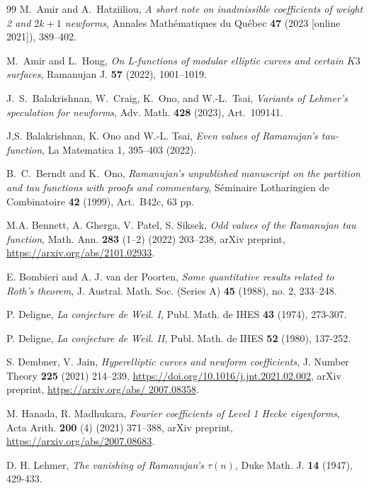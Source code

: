 \documentclass[12pt]{amsart}
\numberwithin{equation}{section}
\begin{document}
\begin{thebibliography}{99}
 M.~Amir and A.~Hatziiliou,
\emph{A short note on inadmissible coefficients of weight 2 and \(2k+1\) newforms},
Annales Mathématiques du Québec \textbf{47} (2023 [online 2021]), 389--402.

 M.~Amir and L.~Hong,
\emph{On L-functions of modular elliptic curves and certain \(K3\) surfaces},
Ramanujan J. \textbf{57} (2022), 1001--1019.

J.~S.~Balakrishnan, W.~Craig, K.~Ono, and W.-L.~Tsai,
\emph{Variants of Lehmer's speculation for newforms},
Adv. Math. \textbf{428} (2023), Art.~109141.

 J,\thinspace{}S. Balakrishnan, K. Ono and W.-L. Tsai,  \emph{Even values of Ramanujan’s tau-function}, La Matematica 1, 395–403 (2022). 

B.~C.~Berndt and K.~Ono, \emph{Ramanujan's unpublished manuscript on the partition and tau functions with proofs and commentary}, 
S\'eminaire Lotharingien de Combinatoire \textbf{42} (1999), Art.~B42c, 63 pp.

 M.A. Bennett, A. Gherga, V. Patel, S. Siksek, \emph{Odd values of the Ramanujan tau function}, Math. Ann. \textbf{283} (1–2) (2022) 203–238, arXiv preprint, \url{https://arxiv.org/abs/2101.02933}.

 E. Bombieri and A. J. van der Poorten, \emph{Some quantitative results related to Roth’s theorem}, J. Austral. Math. Soc. (Series A) \textbf{45} (1988), no. 2, 233–248.

 P. Deligne, \emph{La conjecture de Weil. I}, Publ. Math. de IHES \textbf{43} (1974), 273-307.

 P. Deligne, \emph{La conjecture de Weil. II}, Publ. Math. de IHES \textbf{52} (1980), 137-252.

 S. Dembner, V. Jain, \emph{Hyperelliptic curves and newform coefficients}, J. Number Theory \textbf{225} (2021) 214–239, \url{https://doi.org/10.1016/j.jnt.2021.02.002}, arXiv preprint, \url{https://arxiv.org/abs/ 2007.08358}. 

 M. Hanada, R. Madhukara, \emph{Fourier coefficients of Level 1 Hecke eigenforms}, Acta Arith. \textbf{200} (4) (2021) 371–388, arXiv preprint, \url{https://arxiv.org/abs/2007.08683}. 

 D. H. Lehmer, \emph{The vanishing of Ramanujan's $\tau(n)$}, Duke Math. J. \textbf{14} (1947), 429-433.


\end{thebibliography}
\end{document}
